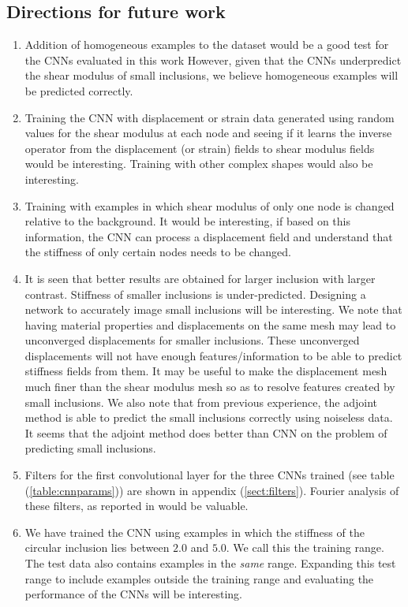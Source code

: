 \documentclass[12pt]{article}
\begin{document}
\subsection{Directions for future work}
\begin{enumerate}
\item{Addition of homogeneous examples to the dataset would be a good test for the CNNs evaluated in this work However, given that the CNNs underpredict the shear modulus of small inclusions, we believe homogeneous examples will be predicted correctly.}
\item{Training the CNN with displacement or strain data generated using random values for the shear modulus at each node and seeing if it learns the inverse operator from the displacement (or strain) fields to shear modulus fields would be interesting. Training with other complex shapes would also be interesting.}
\item{Training with examples in which shear modulus of only one node is changed relative to the background. It would be interesting, if based on this information, the CNN can process a displacement field and understand that the stiffness of only certain nodes needs to be changed.}
\item{It is seen that better results are obtained for larger inclusion with larger contrast. Stiffness of smaller inclusions is under-predicted. Designing a network to accurately image small inclusions will be interesting. We note that having material properties and displacements on the same mesh may lead to unconverged displacements for smaller inclusions. These unconverged displacements will not have enough features/information to be able to predict stiffness fields from them. It may be useful to make the displacement mesh much finer than the shear modulus mesh so as to resolve features created by small inclusions. We also note that from previous experience, the adjoint method \cite{paper:oberai2003} is able to predict the small inclusions correctly using noiseless data. It seems that the adjoint method does better than CNN on the problem of predicting small inclusions.}
\item{Filters for the first convolutional layer for the three CNNs trained (see table (\ref{table:cnnparams})) are shown in appendix (\ref{sect:filters}). Fourier analysis of these filters, as reported in \cite{paper:pateloberai2019} would be valuable.}
\item{We have trained the CNN using examples in which the stiffness of the circular inclusion lies between $2.0$ and $5.0$. We call this the training range. The test data also contains examples in the \textit{same} range. Expanding this test range to include examples outside the training range and evaluating the performance of the CNNs will be interesting.}

\end{enumerate}
\end{document}
